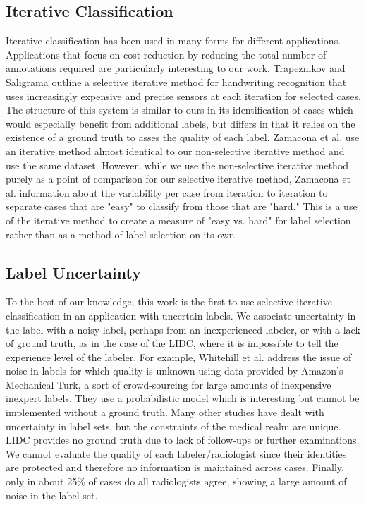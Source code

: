 \documentclass[]{spie}
\begin{document}
\subsection{Iterative Classification}
Iterative classification has been used in many forms for different applications\cite{ji2011ranking}\cite{monahan2000developing}. Applications that focus on cost reduction by reducing the total number of annotations required are particularly interesting to our work. Trapeznikov and Saligrama outline a selective iterative method for handwriting recognition that uses increasingly expensive and precise sensors at each iteration for selected cases. The structure of this system is similar to ours in its identification of cases which would especially benefit from additional labels, but differs in that it relies on the existence of a ground truth to asses the quality of each label. Zamacona et al. \cite{Zamacona13} use an iterative method almost identical to our non-selective iterative method and use the same dataset. However, while we use the non-selective iterative method purely as a point of comparison for our selective iterative method, Zamacona et al. information about the variability per case from iteration to iteration to separate cases that are "easy" to classify from those that are "hard." This is a use of the iterative method to create a measure of "easy vs. hard" for label selection rather than as a method of label selection on its own.

\subsection{Label Uncertainty}
To the best of our knowledge, this work is the first to use selective iterative classification in an application with uncertain labels. We associate uncertainty in the label with a noisy label, perhaps from an inexperienced labeler, or with a lack of ground truth, as in the case of the LIDC, where it is impossible to tell the experience level of the labeler. For example, Whitehill et al. \cite{whitehill2009whose} address the issue of noise in labels for which quality is unknown using data provided by Amazon’s Mechanical Turk, a sort of crowd-sourcing for large amounts of inexpensive inexpert labels. They use a probabilistic model which is interesting but cannot be implemented without a ground truth. Many other studies have dealt with uncertainty in label sets, but the constraints of the medical realm are unique. LIDC provides no ground truth due to lack of follow-ups or further examinations. We cannot evaluate the quality of each labeler/radiologist since their identities are protected and therefore no information is maintained across cases. Finally, only in about 25\% of cases do all radiologists agree, showing a large amount of noise in the label set.
\end{document}
